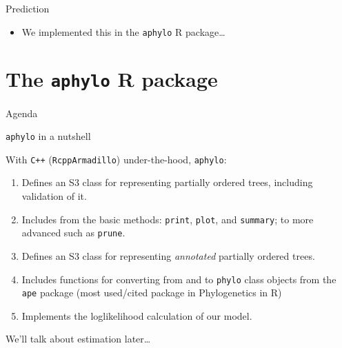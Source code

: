 \documentclass[9pt,ignorenonframetext,]{beamer}
\providecommand{\tightlist}{%
  \setlength{\itemsep}{0pt}\setlength{\parskip}{0pt}}
\begin{document}
\begin{frame}[fragile]{Prediction}

\begin{itemize}
\tightlist
\item
  We implemented this in the \texttt{aphylo} R package\ldots{}
\end{itemize}

\end{frame}

\section{\texorpdfstring{The \texttt{aphylo} R
package}{The aphylo R package}}\label{the-aphylo-r-package}

\begin{frame}{Agenda}

\tableofcontents[currentsection]

\end{frame}

\begin{frame}[fragile]{\texttt{aphylo} in a nutshell}

With \texttt{C++} (\texttt{RcppArmadillo}) under-the-hood,
\texttt{aphylo}:

\begin{enumerate}
\def\labelenumi{\arabic{enumi}.}
\item
  Defines an S3 class for representing partially ordered trees,
  including validation of it.
\item
  Includes from the basic methods: \texttt{print}, \texttt{plot}, and
  \texttt{summary}; to more advanced such as \texttt{prune}.
\item
  Defines an S3 class for representing \emph{annotated} partially
  ordered trees.
\item
  Includes functions for converting from and to \texttt{phylo} class
  objects from the \texttt{ape} package (most used/cited package in
  Phylogenetics in R)
\item
  Implements the loglikelihood calculation of our model.
\end{enumerate}

We'll talk about estimation later\ldots{}

\end{frame}
\end{document}
